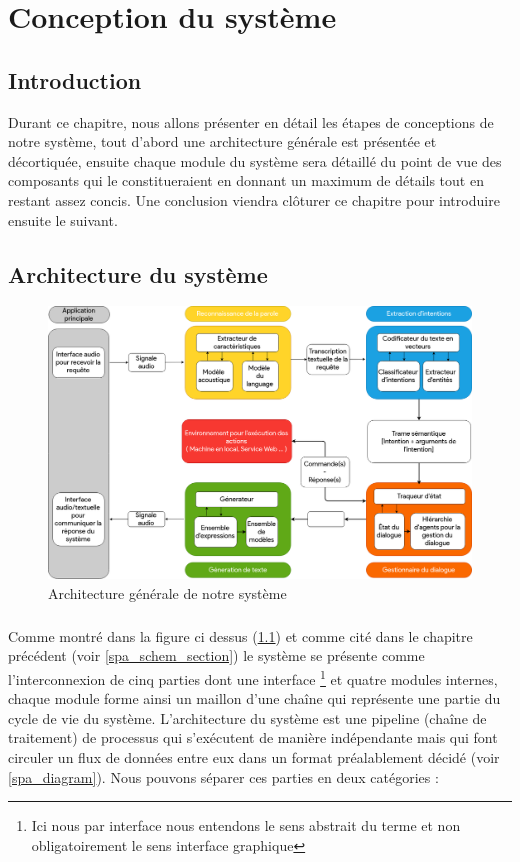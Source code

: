 \chapter{Conception du système}

\section{Introduction}
Durant ce chapitre, nous allons présenter en détail les étapes de conceptions de notre système, tout d'abord une architecture générale est présentée et décortiquée, ensuite chaque module du système sera détaillé du point de vue des composants qui le constitueraient en donnant un maximum de détails tout en restant assez concis. Une conclusion viendra clôturer ce chapitre pour introduire ensuite le suivant.
\section{Architecture du système}
\begin{figure}[H]
	\label{spa_arch}
	\centering
	\includegraphics[width=0.88\linewidth]{images/SPA_architecture.png}
	\caption{Architecture générale de notre système}
\end{figure}
\paragraph{}
Comme montré dans la figure ci dessus (\ref{spa_arch}) et comme cité dans le chapitre précédent (voir \ref{spa_schem_section}) le système se présente comme l'interconnexion de cinq parties dont une interface \footnote{Ici nous par interface nous entendons le sens abstrait du terme et non obligatoirement le sens interface graphique} et quatre modules internes, chaque module forme ainsi un maillon d'une chaîne qui représente une partie du cycle de vie du système. L'architecture du système est une pipeline (chaîne de traitement) de processus qui s'exécutent de manière indépendante mais qui font circuler un flux de données entre eux dans un format préalablement décidé (voir \ref{spa_diagram}). Nous pouvons séparer ces parties en deux catégories :
